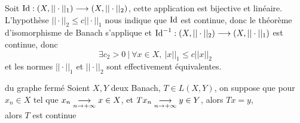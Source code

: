 \documentclass[a4paper,11pt, twoside]{article}
\begin{document}
\begin{Proof}
  Soit $\mathrm{\mathrm{Id}}:(X,||\cdot||_1)\longrightarrow(X,||\cdot||_2)$, cette application est bijective et linéaire. L'hypothèse $||\cdot||_2\leqslant c||\cdot||_1$ nous indique que $\mathrm{\mathrm{Id}}$ est continue, donc le théorème d'isomorphisme de Banach s'applique et $\mathrm{\mathrm{Id}}^{-1}:(X,||\cdot||_2)\longrightarrow(X,||\cdot||_1)$ est continue, donc 
  $$\exists c_2>0\ |\ \forall x\in X,\ |x||_1\leqslant c||x||_2$$
  et les normes $||\cdot||_1$ et $||\cdot||_2$ sont effectivement équivalentes.
\end{Proof}



\begin{thC}{du graphe fermé}
  Soient $X,Y$ deux Banach, $T\in L(X,Y)$, on suppose que pour $x_n\in X$ tel que $x_n\underset{n\to+\infty}{\longrightarrow} x\in X$, et $Tx_n\underset{n\to+\infty}{\longrightarrow} y\in Y$, alors $Tx=y$,\\

  alors $T$ est continue
\end{thC}
\end{document}
